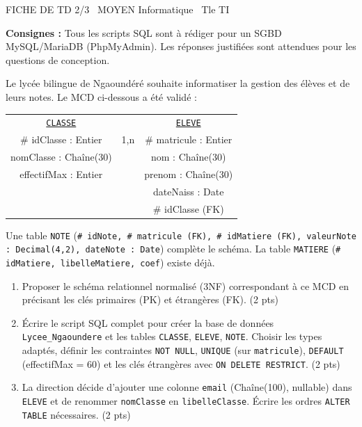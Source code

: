 \documentclass[11pt]{article}
\begin{document}
\begin{tcolorbox}[enhanced,colback=popink,colframe=popink,arc=10pt,boxrule=0pt,left=12pt,right=12pt,top=9pt,bottom=9pt]
{\color{white}\popxbold\small FICHE DE TD 2/3 \textbullet\ MOYEN \hfill Informatique \textbullet\ Tle TI\par}
\end{tcolorbox}
\vspace{4pt}
\noindent \textbf{Consignes :} Tous les scripts SQL sont à rédiger pour un SGBD MySQL/MariaDB (PhpMyAdmin). Les réponses justifiées sont attendues pour les questions de conception.

\begin{exercice}
Le lycée bilingue de Ngaoundéré souhaite informatiser la gestion des élèves et de leurs notes. Le MCD ci-dessous a été validé :
\begin{center}
\begin{tabular}{c c c}
\underline{\texttt{CLASSE}} & & \underline{\texttt{ELEVE}} \\
\# idClasse : Entier & 1,n & \# matricule : Entier \\
nomClasse : Chaîne(30) & \textemdash{} & nom : Chaîne(30) \\
effectifMax : Entier & & prenom : Chaîne(30) \\
& & dateNaiss : Date \\
& & \# idClasse (FK) \\
\end{tabular}
\end{center}
Une table \texttt{NOTE} (\texttt{\# idNote, \# matricule (FK), \# idMatiere (FK), valeurNote : Decimal(4,2), dateNote : Date}) complète le schéma. La table \texttt{MATIERE} (\texttt{\# idMatiere, libelleMatiere, coef}) existe déjà.
\begin{enumerate}
    \item Proposer le schéma relationnel normalisé (3NF) correspondant à ce MCD en précisant les clés primaires (PK) et étrangères (FK). \hfill (2 pts)
    \item Écrire le script SQL complet pour créer la base de données \texttt{Lycee\_Ngaoundere} et les tables \texttt{CLASSE}, \texttt{ELEVE}, \texttt{NOTE}. Choisir les types adaptés, définir les contraintes \texttt{NOT NULL}, \texttt{UNIQUE} (sur \texttt{matricule}), \texttt{DEFAULT} (effectifMax = 60) et les clés étrangères avec \texttt{ON DELETE RESTRICT}. \hfill (2 pts)
    \item La direction décide d'ajouter une colonne \texttt{email} (Chaîne(100), nullable) dans \texttt{ELEVE} et de renommer \texttt{nomClasse} en \texttt{libelleClasse}. Écrire les ordres \texttt{ALTER TABLE} nécessaires. \hfill (2 pts)
\end{enumerate}
\end{exercice}
\end{document}
